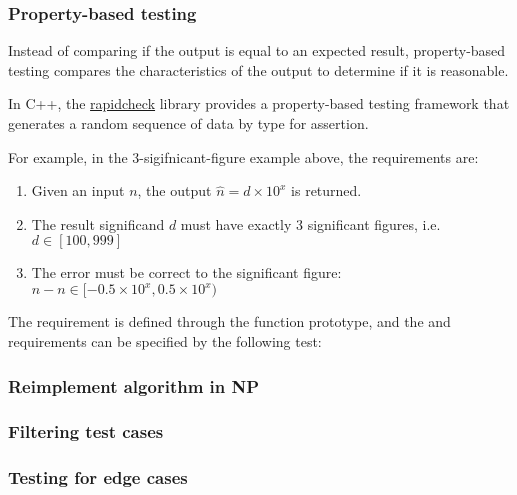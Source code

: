 \subsubsection{Property-based testing}
Instead of comparing if the output is equal to an expected result,
property-based testing compares the characteristics of the output to determine if it is reasonable.

In C++, the \href{https://github.com/emil-e/rapidcheck}{rapidcheck} library
provides a property-based testing framework that generates a random sequence of data by type for assertion.

For example, in the 3-sigifnicant-figure example above, the requirements are:

\begin{enumerate}
	\item Given an input $n$, the output $\hat{n} = d \times 10^{x}$ is returned.
	\item The result significand $d$ must have exactly 3 significant figures, i.e. $d \in [100, 999]$
	\item The error must be correct to the  significant figure: $\hat{n} - n \in [-0.5 \times 10^{x}, 0.5 \times 10^{x})$
\end{enumerate}

The  requirement is defined through the function prototype,
and the  and  requirements can be specified by the following test:


\subsubsection{Reimplement algorithm in NP}

\subsubsection{Filtering test cases}



\subsubsection{Testing for edge cases}
